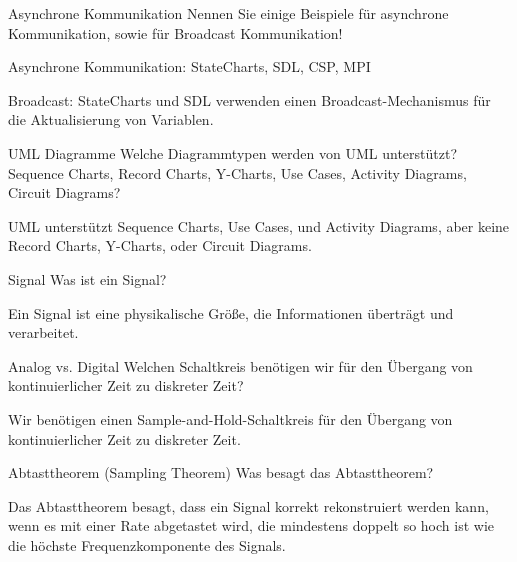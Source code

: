 \documentclass{article}
\begin{document}
\begin{exercise}{Asynchrone Kommunikation}
  Nennen Sie einige Beispiele für asynchrone Kommunikation, sowie für Broadcast Kommunikation!

  \begin{solution}
    Asynchrone Kommunikation: StateCharts, SDL, CSP, MPI

    Broadcast: StateCharts und SDL verwenden einen Broadcast-Mechanismus für die Aktualisierung von Variablen.
  \end{solution}
\end{exercise}

\begin{exercise}{UML Diagramme}
  Welche Diagrammtypen werden von UML unterstützt? Sequence Charts, Record Charts, Y-Charts, Use Cases, Activity Diagrams, Circuit Diagrams?

  \begin{solution}
    UML unterstützt Sequence Charts, Use Cases, und Activity Diagrams, aber keine Record Charts, Y-Charts, oder Circuit Diagrams.
  \end{solution}
\end{exercise}


\begin{exercise}{Signal}
  Was ist ein Signal?

  \begin{solution}
    Ein Signal ist eine physikalische Größe, die Informationen überträgt und verarbeitet.
  \end{solution}
\end{exercise}

\begin{exercise}{Analog vs. Digital}
  Welchen Schaltkreis benötigen wir für den Übergang von kontinuierlicher Zeit zu diskreter Zeit?

  \begin{solution}
    Wir benötigen einen Sample-and-Hold-Schaltkreis für den Übergang von kontinuierlicher Zeit zu diskreter Zeit.
  \end{solution}
\end{exercise}

\begin{exercise}{Abtasttheorem (Sampling Theorem)}
  Was besagt das Abtasttheorem?

  \begin{solution}
    Das Abtasttheorem besagt, dass ein Signal korrekt rekonstruiert werden kann, wenn es mit einer Rate abgetastet wird, die mindestens doppelt so hoch ist wie die höchste Frequenzkomponente des Signals.
  \end{solution}
\end{exercise}
\end{document}
